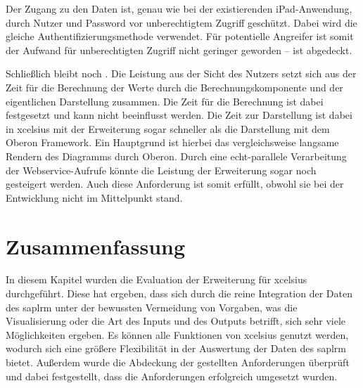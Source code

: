 \begin{onehalfspacing}
Der Zugang zu den Daten ist, genau wie bei der existierenden iPad-Anwendung, durch Nutzer und Password vor unberechtigtem Zugriff geschützt. Dabei wird die gleiche Authentifizierungsmethode verwendet. Für potentielle Angreifer ist somit der Aufwand für unberechtigten Zugriff nicht geringer geworden --  ist abgedeckt.

Schließlich bleibt noch . Die Leistung aus der Sicht des Nutzers setzt sich aus der Zeit für die Berechnung der Werte durch die Berechnungskomponente und der eigentlichen Darstellung zusammen. Die Zeit für die Berechnung ist dabei festgesetzt und kann nicht beeinflusst werden. Die Zeit zur Darstellung ist dabei in \gls{xcelsius} mit der Erweiterung sogar schneller als die Darstellung mit dem Oberon Framework. Ein Hauptgrund ist hierbei das vergleichsweise langsame Rendern des Diagramms durch Oberon. Durch eine echt-parallele Verarbeitung der Webservice-Aufrufe könnte die Leistung der Erweiterung sogar noch gesteigert werden. Auch diese Anforderung ist somit erfüllt, obwohl sie bei der Entwicklung nicht im Mittelpunkt stand.

\section{Zusammenfassung}
In diesem Kapitel wurden die Evaluation der Erweiterung für \gls{xcelsius} durchgeführt. Diese hat ergeben, dass sich durch die reine Integration der Daten des \gls{saplrm} unter der bewussten Vermeidung von Vorgaben, was die Visualisierung oder die Art des Inputs und des Outputs betrifft, sich sehr viele Möglichkeiten ergeben. Es können alle Funktionen von \gls{xcelsius} genutzt werden, wodurch sich eine größere Flexibilität in der Auswertung der Daten des \gls{saplrm} bietet. Außerdem wurde die Abdeckung der gestellten Anforderungen überprüft und dabei festgestellt, dass die Anforderungen erfolgreich umgesetzt wurden.


\end{onehalfspacing}
